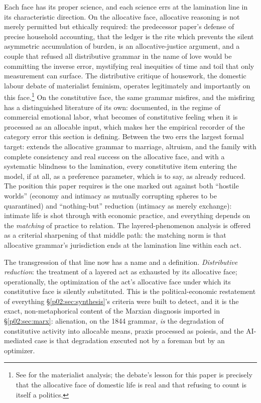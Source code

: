 \documentclass[11pt,a4paper]{article}
\newcommand{\term}[1]{\textit{\textcolor{pinkitalic}{#1}}}
\begin{document}
Each face has its proper science, and each science errs at the lamination line in its characteristic direction. On the allocative face, allocative reasoning is not merely permitted but ethically required: the predecessor paper's defense of precise household accounting, that the ledger is the rite which prevents the silent asymmetric accumulation of burden, is an allocative-justice argument, and a couple that refused all distributive grammar in the name of love would be committing the inverse error, mystifying real inequities of time and toil that only measurement can surface. The distributive critique of housework, the domestic labour debate of materialist feminism, operates legitimately and importantly on this face.\footnote{See \textcite{delphy1984close} for the materialist analysis; the debate's lesson for this paper is precisely that the allocative face of domestic life is real and that refusing to count is itself a politics.} On the constitutive face, the same grammar misfires, and the misfiring has a distinguished literature of its own: \textcite{hochschild1983managed} documented, in the regime of commercial emotional labor, what becomes of constitutive feeling when it is processed as an allocable input, which makes her the empirical recorder of the category error this section is defining. Between the two errs the largest formal target: \textcite{becker1981treatise} extends the allocative grammar to marriage, altruism, and the family with complete consistency and real success on the allocative face, and with a systematic blindness to the lamination, every constitutive item entering the model, if at all, as a preference parameter, which is to say, as already reduced. The position this paper requires is the one \textcite{zelizer2005purchase} marked out against both ``hostile worlds'' (economy and intimacy as mutually corrupting spheres to be quarantined) and ``nothing-but'' reduction (intimacy as merely exchange): intimate life is shot through with economic practice, and everything depends on the \emph{matching} of practice to relation. The layered-phenomenon analysis is offered as a criterial sharpening of that middle path: the matching norm is that allocative grammar's jurisdiction ends at the lamination line within each act.

The transgression of that line now has a name and a definition. \term{Distributive reduction}: the treatment of a layered act as exhausted by its allocative face; operationally, the optimization of the act's allocative face under which its constitutive face is silently substituted. This is the political-economic restatement of everything \S\ref{p02:sec:synthesis}'s criteria were built to detect, and it is the exact, non-metaphorical content of the Marxian diagnosis imported in \S\ref{p02:sec:marx}: alienation, on the 1844 grammar, \emph{is} the degradation of constitutive activity into allocable means, praxis processed as poiesis, and the AI-mediated case is that degradation executed not by a foreman but by an optimizer.
\end{document}
